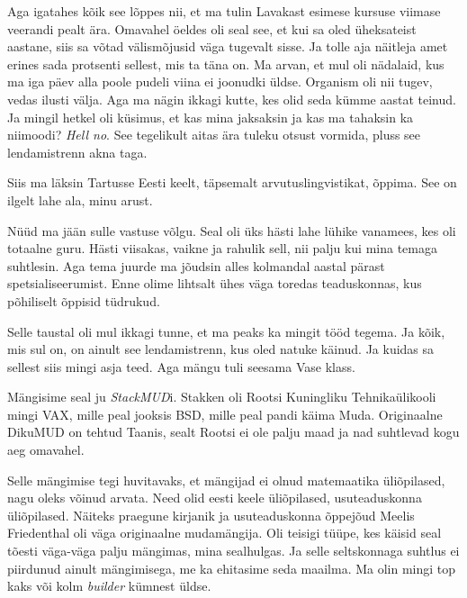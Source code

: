 Aga igatahes kõik see lõppes nii, et ma tulin Lavakast esimese kursuse viimase veerandi 
pealt ära. Omavahel öeldes oli seal see, et kui sa oled üheksateist aastane, 
siis sa  võtad välismõjusid väga tugevalt sisse. Ja tolle aja  
näitleja amet erines sada protsenti sellest, mis ta täna on. Ma arvan, et  mul 
oli nädalaid, kus ma iga päev alla poole pudeli viina ei joonudki üldse. 
Organism oli nii tugev, vedas ilusti välja. Aga ma nägin ikkagi kutte, kes olid 
seda kümme aastat teinud. Ja mingil hetkel oli küsimus, et kas mina jaksaksin 
ja kas ma tahaksin ka niimoodi? \emph{Hell no}. See tegelikult  aitas ära 
tuleku otsust vormida, pluss see lendamistrenn akna taga. 

Siis ma läksin Tartusse Eesti keelt, täpsemalt 
arvutuslingvistikat, õppima. See on ilgelt lahe ala, minu arust.


Nüüd ma jään sulle vastuse võlgu. Seal oli üks hästi lahe lühike vanamees, kes 
oli  totaalne guru. Hästi viisakas, vaikne ja rahulik sell, nii palju kui 
mina temaga suhtlesin. Aga tema juurde ma jõudsin alles kolmandal aastal pärast 
spetsialiseerumist. Enne olime lihtsalt ühes väga toredas teaduskonnas, kus 
põhiliselt õppisid tüdrukud.

Selle taustal oli mul ikkagi tunne, et ma peaks ka mingit tööd tegema. Ja kõik, 
mis sul on, on ainult see lendamistrenn, kus oled natuke käinud. Ja kuidas sa 
sellest siis mingi asja teed. Aga mängu tuli seesama Vase klass.

Mängisime seal ju \emph{StackMUD}i. Stakken oli Rootsi 
Kuningliku Tehnikaülikooli mingi 
VAX, mille peal 
jooksis BSD, mille peal pandi käima Muda. 
Originaalne DikuMUD on tehtud Taanis, sealt Rootsi ei ole palju maad ja nad 
suhtlevad kogu aeg omavahel.

Selle mängimise tegi huvitavaks, et mängijad ei olnud  matemaatika üliõpilased, 
nagu oleks võinud arvata. Need olid eesti keele üliõpilased, usuteaduskonna 
üliõpilased. Näiteks praegune kirjanik ja usuteaduskonna õppejõud Meelis 
Friedenthal oli väga originaalne mudamängija. 
Oli teisigi tüüpe, kes  käisid seal tõesti väga-väga palju mängimas, mina 
sealhulgas. Ja selle seltskonnaga suhtlus ei  piirdunud ainult 
mängimisega, me ka ehitasime seda maailma. Ma olin mingi top kaks või kolm 
\emph{builder} kümnest üldse.

